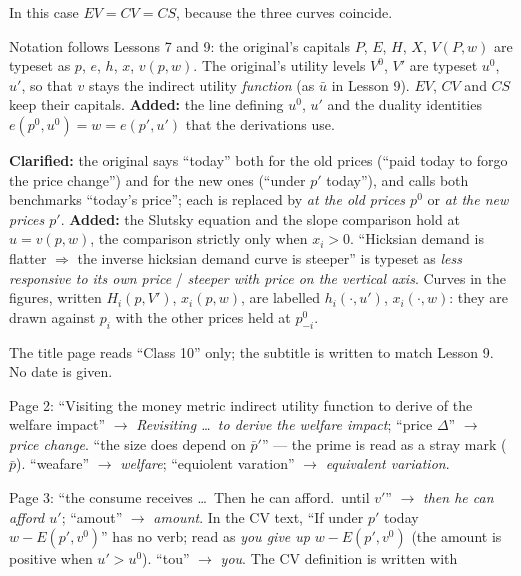 \documentclass[11pt]{article}
\begin{document}
In this case $EV=CV=CS$, because the three curves coincide.


\begin{transcriptnotes}
  \item Notation follows Lessons 7 and 9: the original's capitals $P$, $E$, $H$,
        $X$, $V(P,w)$ are typeset as $p$, $e$, $h$, $x$, $v(p,w)$. The original's
        utility levels $V^0$, $V'$ are typeset $u^0$, $u'$, so that $v$ stays the
        indirect utility \emph{function} (as $\bar u$ in Lesson 9). $EV$, $CV$ and
        $CS$ keep their capitals. \textbf{Added:} the line defining $u^0$, $u'$ and
        the duality identities $e(p^0,u^0)=w=e(p',u')$ that the derivations use.
  \item \textbf{Clarified:} the original says ``today'' both for the old prices
        (``paid today to forgo the price change'') and for the new ones (``under
        $p'$ today''), and calls both benchmarks ``today's price''; each is replaced
        by \emph{at the old prices $p^0$} or \emph{at the new prices $p'$}.
        \textbf{Added:} the Slutsky equation and the slope comparison hold at
        $u=v(p,w)$, the comparison strictly only when $x_i>0$. ``Hicksian demand is
        flatter $\Rightarrow$ the inverse hicksian demand curve is steeper'' is
        typeset as \emph{less responsive to its own price} / \emph{steeper with
        price on the vertical axis}. Curves in the figures, written $H_i(p,V')$,
        $x_i(p,w)$, are labelled $h_i(\cdot,u')$, $x_i(\cdot,w)$: they are drawn
        against $p_i$ with the other prices held at $p_{-i}^0$.
  \item The title page reads ``Class 10'' only; the subtitle is written to match
        Lesson 9. No date is given.
  \item Page 2: ``Visiting the money metric indirect utility function to derive of
        the welfare impact'' $\to$ \emph{Revisiting \dots\ to derive the welfare
        impact}; ``price $\Delta$'' $\to$ \emph{price change}. ``the size does
        depend on $\bar p'$'' --- the prime is read as a stray mark ($\bar p$).
        ``weafare'' $\to$ \emph{welfare}; ``equiolent varation'' $\to$
        \emph{equivalent variation}.
  \item Page 3: ``the consume receives \dots\ Then he can afford.\ until $v'$''
        $\to$ \emph{then he can afford $u'$}; ``amout'' $\to$ \emph{amount}.
        In the CV text, ``If under $p'$ today $w-E(p',v^0)$'' has no verb; read as
        \emph{you give up} $w-E(p',v^0)$ (the amount is positive when $u'>u^0$).
        ``tou'' $\to$ \emph{you}. The CV definition is written with

\end{transcriptnotes}
\end{document}
